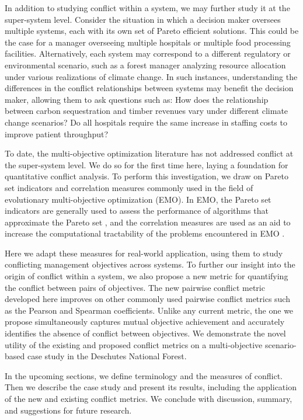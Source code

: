 In addition to studying conflict within a system, we may further study it at the super-system level. Consider the situation in which a decision maker oversees multiple systems, each with its own set of Pareto efficient solutions. This could be the case for a manager overseeing multiple hospitals or multiple food processing facilities. Alternatively, each system may correspond to a different regulatory or environmental scenario, such as a forest manager analyzing resource allocation under various realizations of climate change. In such instances, understanding the differences in the conflict relationships between systems may benefit the decision maker, allowing them to ask questions such as: How does the relationship between carbon sequestration and timber revenues vary under different climate change scenarios? Do all hospitals require the same increase in staffing costs to improve patient throughput?

To date, the multi-objective optimization literature has not addressed conflict at the super-system level. We do so for the first time here, laying a foundation for quantitative conflict analysis. To perform this investigation, we draw on Pareto set indicators and correlation measures commonly used in the field of evolutionary multi-objective optimization (EMO). In EMO, the Pareto set indicators are generally used to assess the performance of algorithms that approximate the Pareto set \cite{zitzler2003performance}, and the correlation measures are used as an aid to increase the computational tractability of the problems encountered in EMO \cite{brockhoff2006all}.

Here we adapt these measures for real-world application, using them to study conflicting management objectives across systems. To further our insight into the origin of conflict within a system, we also propose a new metric for quantifying the conflict between pairs of objectives. The new pairwise conflict metric developed here improves on other commonly used pairwise conflict metrics such as the Pearson and Spearman coefficients. Unlike any current metric, the one we propose simultaneously captures mutual objective achievement and accurately identifies the absence of conflict between objectives. We demonstrate the novel utility of the existing and proposed conflict metrics on a multi-objective scenario-based case study in the Deschutes National Forest.

In the upcoming sections, we define terminology and the measures of conflict. Then we describe the case study and present its results, including the application of the new and existing conflict metrics. We conclude with discussion, summary, and suggestions for future research.
